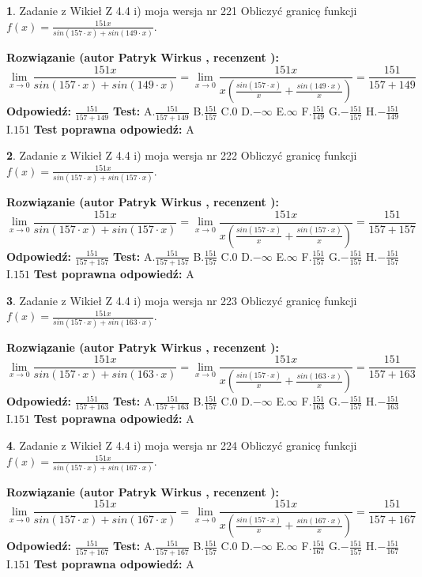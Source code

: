 \documentclass[12pt, a4paper]{article}
\theoremstyle{definition} %
\newtheorem{zad}{}
\newcommand{\zadStart}[1]{\begin{zad}#1\newline}
\newcommand{\zadStop}{\end{zad}}
\newcommand{\rozwStart}[2]{\noindent \textbf{Rozwiązanie (autor #1 , recenzent #2): }\newline}
\newcommand{\rozwStop}{\newline}
\newcommand{\odpStart}{\noindent \textbf{Odpowiedź:}\newline}
\newcommand{\odpStop}{\newline}
\newcommand{\testStart}{\noindent \textbf{Test:}\newline}
\newcommand{\testStop}{\newline}
\newcommand{\kluczStart}{\noindent \textbf{Test poprawna odpowiedź:}\newline}
\newcommand{\kluczStop}{\newline}
\begin{document}
\zadStart{Zadanie z Wikieł Z 4.4 i) moja wersja nr 221}
Obliczyć granicę funkcji $f(x)=\frac{151x}{sin(157\cdot x) +sin(149\cdot x)}$.
\zadStop
\rozwStart{Patryk Wirkus}{}
$$\lim\limits_{x\to 0}\frac{151x}{sin(157\cdot x) +sin(149\cdot x)}=\lim\limits_{x\to 0}\frac{151x}{x(\frac{sin(157\cdot x)}{x}+\frac{sin(149\cdot x)}{x})}=\frac{151}{157+149}$$
\rozwStop
\odpStart
$\frac{151}{157+149}$
\odpStop
\testStart
A.$\frac{151}{157+149}$
B.$\frac{151}{157}$
C.$0$
D.$-\infty$
E.$\infty$
F.$\frac{151}{149}$
G.$-\frac{151}{157}$
H.$-\frac{151}{149}$
I.$151$
\testStop
\kluczStart
A
\kluczStop



\zadStart{Zadanie z Wikieł Z 4.4 i) moja wersja nr 222}
Obliczyć granicę funkcji $f(x)=\frac{151x}{sin(157\cdot x) +sin(157\cdot x)}$.
\zadStop
\rozwStart{Patryk Wirkus}{}
$$\lim\limits_{x\to 0}\frac{151x}{sin(157\cdot x) +sin(157\cdot x)}=\lim\limits_{x\to 0}\frac{151x}{x(\frac{sin(157\cdot x)}{x}+\frac{sin(157\cdot x)}{x})}=\frac{151}{157+157}$$
\rozwStop
\odpStart
$\frac{151}{157+157}$
\odpStop
\testStart
A.$\frac{151}{157+157}$
B.$\frac{151}{157}$
C.$0$
D.$-\infty$
E.$\infty$
F.$\frac{151}{157}$
G.$-\frac{151}{157}$
H.$-\frac{151}{157}$
I.$151$
\testStop
\kluczStart
A
\kluczStop



\zadStart{Zadanie z Wikieł Z 4.4 i) moja wersja nr 223}
Obliczyć granicę funkcji $f(x)=\frac{151x}{sin(157\cdot x) +sin(163\cdot x)}$.
\zadStop
\rozwStart{Patryk Wirkus}{}
$$\lim\limits_{x\to 0}\frac{151x}{sin(157\cdot x) +sin(163\cdot x)}=\lim\limits_{x\to 0}\frac{151x}{x(\frac{sin(157\cdot x)}{x}+\frac{sin(163\cdot x)}{x})}=\frac{151}{157+163}$$
\rozwStop
\odpStart
$\frac{151}{157+163}$
\odpStop
\testStart
A.$\frac{151}{157+163}$
B.$\frac{151}{157}$
C.$0$
D.$-\infty$
E.$\infty$
F.$\frac{151}{163}$
G.$-\frac{151}{157}$
H.$-\frac{151}{163}$
I.$151$
\testStop
\kluczStart
A
\kluczStop



\zadStart{Zadanie z Wikieł Z 4.4 i) moja wersja nr 224}
Obliczyć granicę funkcji $f(x)=\frac{151x}{sin(157\cdot x) +sin(167\cdot x)}$.
\zadStop
\rozwStart{Patryk Wirkus}{}
$$\lim\limits_{x\to 0}\frac{151x}{sin(157\cdot x) +sin(167\cdot x)}=\lim\limits_{x\to 0}\frac{151x}{x(\frac{sin(157\cdot x)}{x}+\frac{sin(167\cdot x)}{x})}=\frac{151}{157+167}$$
\rozwStop
\odpStart
$\frac{151}{157+167}$
\odpStop
\testStart
A.$\frac{151}{157+167}$
B.$\frac{151}{157}$
C.$0$
D.$-\infty$
E.$\infty$
F.$\frac{151}{167}$
G.$-\frac{151}{157}$
H.$-\frac{151}{167}$
I.$151$
\testStop
\kluczStart
A
\kluczStop
\end{document}
